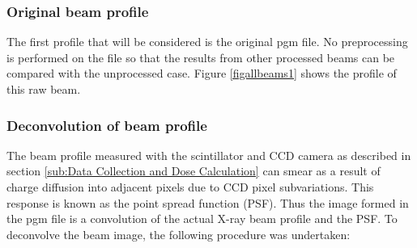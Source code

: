 \subsubsection{Original beam profile}
\label{subs:Original beam profile}
The first profile that will be considered is the original pgm file. No preprocessing is performed on the file so that the results from other processed beams can be compared with the unprocessed case. Figure \ref{figallbeams1} shows the profile of this raw beam.

\subsubsection{Deconvolution of beam profile}
\label{subs:Deconvolution of beam profile}
The beam profile measured with the scintillator and CCD camera as described in section \ref{sub:Data Collection and Dose Calculation} can smear as a result of charge diffusion into adjacent pixels due to CCD pixel subvariations.
This response is known as the point spread function (PSF).
Thus the image formed in the pgm file is a convolution of the actual X-ray beam profile and the PSF.
To deconvolve the beam image, the following procedure was undertaken:

